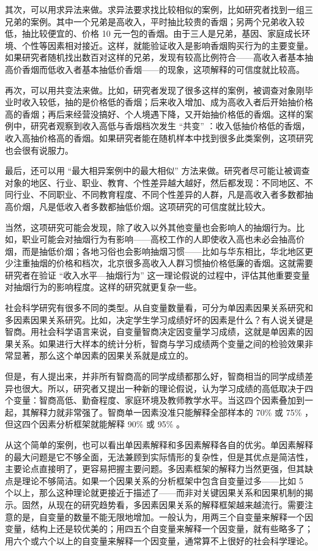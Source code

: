 其次，可以用求异法来做。求异法要求找比较相似的案例，比如研究者找到一组三兄弟的案例。其中一个兄弟是高收入，平时抽比较贵的香烟；另两个兄弟收入较低，抽比较便宜的、价格 10 元一包的香烟。由于三人是兄弟，基因、家庭成长环境、个性等因素相对接近。这样，就能验证收入是影响香烟购买行为的主要变量。如果研究者随机找出数百对这样的兄弟，发现有较高比例符合——高收入者基本抽高价香烟而低收入者基本抽低价香烟——的现象，这项解释的可信度就比较高。

再次，可以用共变法来做。比如，研究者发现了很多这样的案例，被调查对象刚毕业时收入较低，抽的是价格低的香烟；后来收入增加、成为高收入者后开始抽价格高的香烟；再后来经营没搞好、个人境遇下降，又开始抽价格低的香烟。这样的案例中，研究者观察到收入高低与香烟档次发生 “共变” ：收入低抽价格低的香烟，收入高抽价格高的香烟。如果研究者能在随机样本中找到很多此类案例，这项研究也会很有说服力。

最后，还可以用 “最大相异案例中的最大相似” 方法来做。研究者尽可能让被调查对象的地区、行业、职业、教育、个性差异越大越好，然后都发现：不同地区、不同行业、不同职业、不同教育程度、不同个性差异的人群，凡是高收入者多数都抽高价烟，凡是低收入者多数都抽低价烟。这项研究的可信度就比较大。

当然，这项研究可能会发现，除了收入以外其他变量也会影响人的抽烟行为。比如，职业可能会对抽烟行为有影响——高校工作的人即使收入高也未必会抽高价烟，而是抽低价烟；各地习俗也会影响抽烟习惯——比如与华东相比，华北地区更少注重抽烟的价格和档次，北京很多高收入人群习惯抽价格低廉的香烟。这就需要研究者在验证 “收入水平—抽烟行为” 这一理论假说的过程中，评估其他重要变量对抽烟行为的影响程度。这样的研究就更复杂一些。


社会科学研究有很多不同的类型。从自变量数量看，可分为单因素因果关系研究和多因素因果关系研究。比如，决定学生学习成绩好坏的因素是什么？有人说关键是智商。用社会科学语言来说，自变量智商决定因变量学习成绩，这就是单因素的因果关系。如果进行大样本的统计分析，智商与学习成绩两个变量之间的检验效果非常显著，那么这个单因素的因果关系就是成立的。

但是，有人提出来，并非所有智商高的同学成绩都那么好，智商相当的同学成绩差异也很大。所以，研究者又提出一种新的理论假说，认为学习成绩的高低取决于四个变量：智商高低、勤奋程度、家庭环境及教师教学水平。当这四个因素叠加到一起，其解释力就非常强了。智商单一因素没准只能解释全部样本的 70\% 或 75\% ，但这四个因素分析框架就能解释 90\% 或 95\% 。

从这个简单的案例，也可以看出单因素解释和多因素解释各自的优劣。单因素解释的最大问题是它不够全面，无法兼顾到实际情形的复杂性，但是其优点是简洁性，主要论点直接明了，更容易把握主要问题。多因素框架的解释力当然更强，但其缺点是理论不够简洁。如果一个因果关系的分析框架中包含自变量过多——比如 5 个以上，那么这种理论就更接近于描述了——而非对关键因果关系和因果机制的揭示。固然，从现在的研究趋势看，多因素因果关系的解释框架越来越流行。需要注意的是，自变量的数量不能无限地增加。一般认为，用两三个自变量来解释一个因变量，结构上还是较优美的；用四五个自变量来解释一个因变量，就有些略多了；用六个或六个以上的自变量来解释一个因变量，通常算不上很好的社会科学理论。

